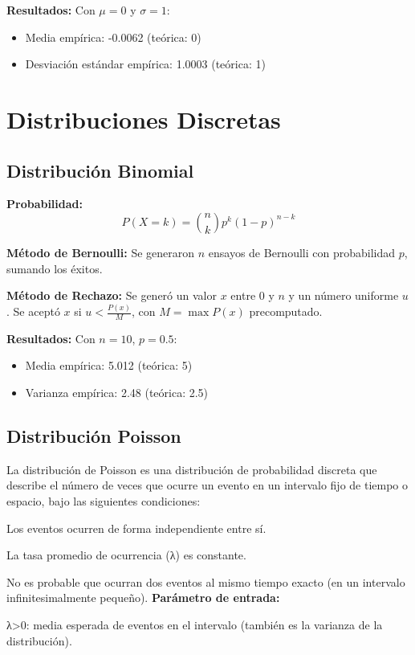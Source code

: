 \documentclass{article}
\begin{document}
\textbf{Resultados:} Con $\mu=0$ y $\sigma=1$:
\begin{itemize}
\item Media empírica: -0.0062 (teórica: 0)
\item Desviación estándar empírica: 1.0003 (teórica: 1)
\end{itemize}

\section{Distribuciones Discretas}

\subsection{Distribución Binomial}
\textbf{Probabilidad:}
\begin{equation}
P(X = k) = \binom{n}{k} p^k (1-p)^{n-k}
\end{equation}

\textbf{Método de Bernoulli:} Se generaron $n$ ensayos de Bernoulli con probabilidad $p$, sumando los éxitos.

\textbf{Método de Rechazo:} Se generó un valor $x$ entre $0$ y $n$ y un número uniforme $u$. Se aceptó $x$ si $u < \frac{P(x)}{M}$, con $M = \max P(x)$ precomputado.

\textbf{Resultados:} Con $n=10$, $p=0.5$:
\begin{itemize}
\item Media empírica: 5.012 (teórica: 5)
\item Varianza empírica: 2.48 (teórica: 2.5)
\end{itemize}

\subsection{Distribución Poisson}
La distribución de Poisson es una distribución de probabilidad discreta que describe el número de veces que ocurre un evento en un intervalo fijo de tiempo o espacio, bajo las siguientes condiciones:

\item Los eventos ocurren de forma independiente entre sí.
\item La tasa promedio de ocurrencia (λ) es constante.
\item No es probable que ocurran dos eventos al mismo tiempo exacto (en un intervalo infinitesimalmente pequeño).
\textbf{Parámetro de entrada:}
\begin{itemize}
λ>0: media esperada de eventos en el intervalo (también es la varianza de la distribución).
\end{itemize}
\end{document}
